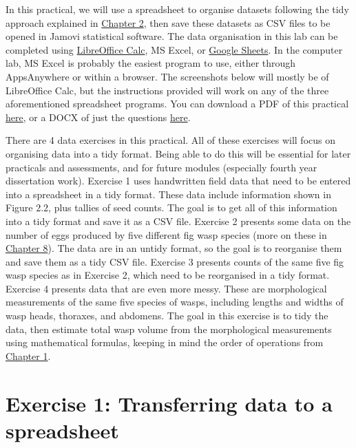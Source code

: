 \documentclass[
]{scrbook}
\begin{document}
In this practical, we will use a spreadsheet to organise datasets following the tidy approach explained in \protect\hyperlink{Chapter_2}{Chapter 2}, then save these datasets as CSV files to be opened in Jamovi statistical software.
The data organisation in this lab can be completed using \href{https://www.libreoffice.org/discover/calc/}{LibreOffice Calc}, MS Excel, or \href{https://docs.google.com/spreadsheets/}{Google Sheets}.
In the computer lab, MS Excel is probably the easiest program to use, either through AppsAnywhere or within a browser.
The screenshots below will mostly be of LibreOffice Calc, but the instructions provided will work on any of the three aforementioned spreadsheet programs.
You can download a PDF of this practical \href{https://bradduthie.github.io/SCIU4T4/chapters/chapter_3.pdf}{here}, or a DOCX of just the questions \href{https://bradduthie.github.io/SCIU4T4/practical_answers/Week1.docx}{here}.

There are 4 data exercises in this practical.
All of these exercises will focus on organising data into a tidy format.
Being able to do this will be essential for later practicals and assessments, and for future modules (especially fourth year dissertation work).
Exercise 1 uses handwritten field data that need to be entered into a spreadsheet in a tidy format.
These data include information shown in Figure 2.2, plus tallies of seed counts.
The goal is to get all of this information into a tidy format and save it as a CSV file.
Exercise 2 presents some data on the number of eggs produced by five different fig wasp species (more on these in \protect\hyperlink{Chapter_8}{Chapter 8}).
The data are in an untidy format, so the goal is to reorganise them and save them as a tidy CSV file.
Exercise 3 presents counts of the same five fig wasp species as in Exercise 2, which need to be reorganised in a tidy format.
Exercise 4 presents data that are even more messy.
These are morphological measurements of the same five species of wasps, including lengths and widths of wasp heads, thoraxes, and abdomens.
The goal in this exercise is to tidy the data, then estimate total wasp volume from the morphological measurements using mathematical formulas, keeping in mind the order of operations from \protect\hyperlink{Chapter_1}{Chapter 1}.

\hypertarget{exercise-1-transferring-data-to-a-spreadsheet}{%
\section{Exercise 1: Transferring data to a spreadsheet}\label{exercise-1-transferring-data-to-a-spreadsheet}}
\end{document}
